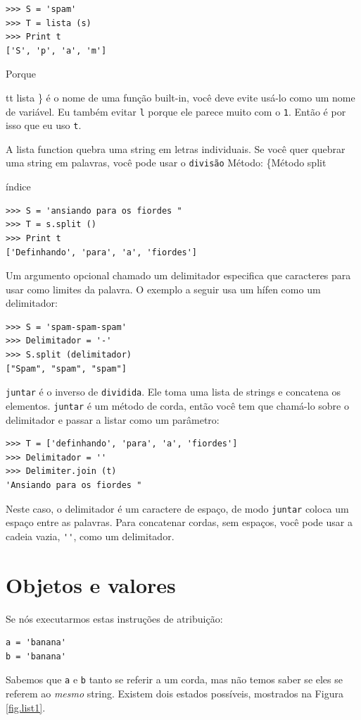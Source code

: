 \documentclass[10pt]{book}
\begin{document}
\begin{exercise}
\begin{verbatim}
>>> S = 'spam'
>>> T = lista (s)
>>> Print t
['S', 'p', 'a', 'm']
\end{verbatim}
%
Porque {tt lista \} é o nome de uma função built-in, você deve
evite usá-lo como um nome de variável. Eu também evitar {\tt l} porque
ele parece muito com o {\tt 1}. Então é por isso que eu uso {\tt t}.

A lista {\tt} function quebra uma string em letras individuais. Se
você quer quebrar uma string em palavras, você pode usar o {\tt divisão}
Método:
\{Método split} índice

\begin{verbatim}
>>> S = 'ansiando para os fiordes "
>>> T = s.split ()
>>> Print t
['Definhando', 'para', 'a', 'fiordes']
\end{verbatim}
%
Um argumento opcional chamado um delimitador {\bf} especifica que
caracteres para usar como limites da palavra.
O exemplo a seguir
usa um hífen como um delimitador:

\begin{verbatim}
>>> S = 'spam-spam-spam'
>>> Delimitador = '-'
>>> S.split (delimitador)
["Spam", "spam", "spam"]
\end{verbatim}
%
{\tt juntar} é o inverso de {\tt dividida}. Ele
toma uma lista de strings e
concatena os elementos. {\tt juntar} é um método de corda,
então você tem que chamá-lo sobre o delimitador e passar a
listar como um parâmetro:

\begin{verbatim}
>>> T = ['definhando', 'para', 'a', 'fiordes']
>>> Delimitador = ''
>>> Delimiter.join (t)
'Ansiando para os fiordes "
\end{verbatim}
%
Neste caso, o delimitador é um caractere de espaço, de modo
{\tt juntar} coloca um espaço entre as palavras. Para concatenar
cordas, sem espaços, você pode usar a cadeia vazia,
\Verb "''", como um delimitador. 


\section {Objetos e valores}

Se nós executarmos estas instruções de atribuição:

\begin{verbatim}
a = 'banana'
b = 'banana'
\end{verbatim}
%
Sabemos que {\tt a} e {\tt b} tanto se referir a um
corda, mas não temos
saber se eles se referem ao {\em mesmo} string.
Existem dois estados possíveis, mostrados na Figura ~ \ref {fig.list1}.


\end{exercise}
\end{document}
